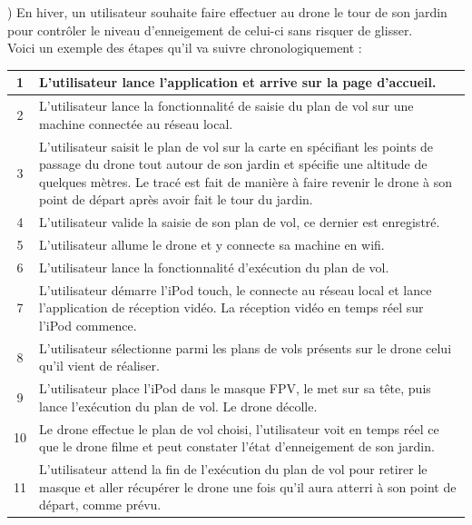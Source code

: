 \documentclass{article}
\begin{document}
        ) En hiver, un utilisateur souhaite faire effectuer au drone le tour de son jardin pour contrôler le niveau d'enneigement de celui-ci sans risquer de glisser.\\
        Voici un exemple des étapes qu'il va suivre chronologiquement : \\ [1cm]
	    \begin{center}
	    \renewcommand{\arraystretch}{2}
        \begin{tabularx}{15cm}{|c|X|}
            \hline
            1 & L'utilisateur lance l'application et arrive sur la page d'accueil.\\
            \hline
            2 & L'utilisateur lance la fonctionnalité de saisie du plan de vol sur une machine connectée au réseau local.\\
            \hline
            3 & L'utilisateur saisit le plan de vol sur la carte en spécifiant les points de passage du drone tout autour de son jardin et spécifie une altitude de quelques mètres. Le tracé est fait de manière à faire revenir le drone à son point de départ après avoir fait le tour du jardin. \\
            \hline
            4 & L'utilisateur valide la saisie de son plan de vol, ce dernier est enregistré. \\
            \hline
            5 & L'utilisateur allume le drone et y connecte sa machine en wifi. \\
            \hline
            6 & L'utilisateur lance la fonctionnalité d'exécution du plan de vol. \\
            \hline
            7 &  L'utilisateur démarre l'iPod touch, le connecte au réseau local et lance l'application de réception vidéo. La réception vidéo en temps réel sur l'iPod commence.\\
            \hline
            8 & L'utilisateur sélectionne parmi les plans de vols présents sur le drone celui qu'il vient de réaliser. \\
            \hline
            9 & L'utilisateur place l'iPod dans le masque FPV, le met sur sa tête, puis lance l'exécution du plan de vol. Le drone décolle. \\
            \hline
            10 & Le drone effectue le plan de vol choisi, l'utilisateur voit en temps réel ce que le drone filme et peut constater l'état d'enneigement de son jardin. \\
            \hline
            11 & L'utilisateur attend la fin de l'exécution du plan de vol pour retirer le masque et aller récupérer le drone une fois qu'il aura atterri à son point de départ, comme prévu.\\
            \hline 
        \end{tabularx}
        \end{center}
\end{document}
